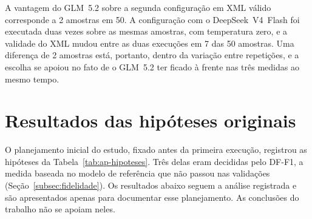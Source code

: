 \begin{apendicesenv}
A vantagem do GLM~5.2 sobre a segunda configuração em XML válido corresponde a 2 amostras em 50. A configuração com o DeepSeek~V4~Flash foi executada duas vezes sobre as mesmas amostras, com temperatura zero, e a validade do XML mudou entre as duas execuções em 7 das 50 amostras. Uma diferença de 2 amostras está, portanto, dentro da variação entre repetições, e a escolha se apoiou no fato de o GLM~5.2 ter ficado à frente nas três medidas ao mesmo tempo.

\chapter{Resultados das hipóteses originais}\label{ap:hipoteses-originais}

O planejamento inicial do estudo, fixado antes da primeira execução, registrou as hipóteses da Tabela~\ref{tab:ap-hipoteses}. Três delas eram decididas pelo DF-F1, a medida baseada no modelo de referência que não passou nas validações (Seção~\ref{subsec:fidelidade}). Os resultados abaixo seguem a análise registrada e são apresentados apenas para documentar esse planejamento. As conclusões do trabalho não se apoiam neles.

\begin{table}[htb]
\end{table}


\end{apendicesenv}
